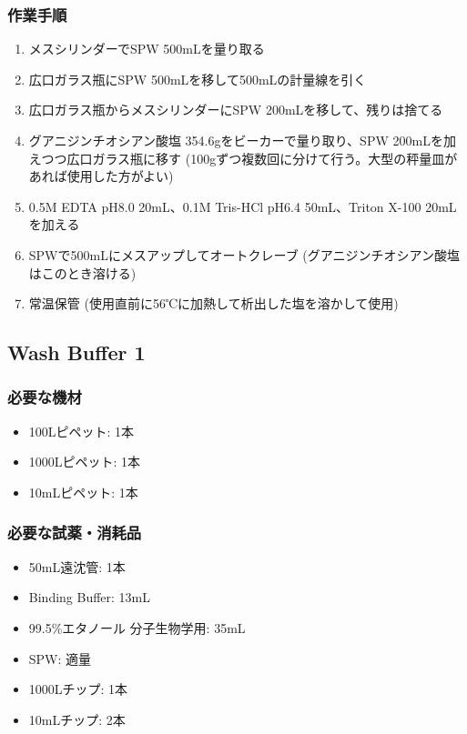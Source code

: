 \documentclass[titlepage,10pt,a4paper,uplatex]{jsbook}
\begin{document}
\subsubsection{作業手順}
\begin{enumerate}
\item メスシリンダーでSPW 500mLを量り取る
\item 広口ガラス瓶にSPW 500mLを移して500mLの計量線を引く
\item 広口ガラス瓶からメスシリンダーにSPW 200mLを移して、残りは捨てる
\item グアニジンチオシアン酸塩 354.6gをビーカーで量り取り、SPW 200mLを加えつつ広口ガラス瓶に移す (100gずつ複数回に分けて行う。大型の秤量皿があれば使用した方がよい)
\item 0.5M EDTA pH8.0 20mL、0.1M Tris-HCl pH6.4 50mL、Triton X-100 20mLを加える
\item SPWで500mLにメスアップしてオートクレーブ (グアニジンチオシアン酸塩はこのとき溶ける)
\item 常温保管 (使用直前に56℃に加熱して析出した塩を溶かして使用)
\end{enumerate}

\subsection{Wash Buffer 1}

\subsubsection{必要な機材}
\begin{itemize}
\item 100{\textmu}Lピペット: 1本
\item 1000{\textmu}Lピペット: 1本
\item 10mLピペット: 1本
\end{itemize}

\subsubsection{必要な試薬・消耗品}
\begin{itemize}
\item 50mL遠沈管: 1本
\item Binding Buffer: 13mL
\item 99.5\%エタノール 分子生物学用: 35mL
\item SPW: 適量
\item 1000{\textmu}Lチップ: 1本
\item 10mLチップ: 2本
\end{itemize}
\end{document}
